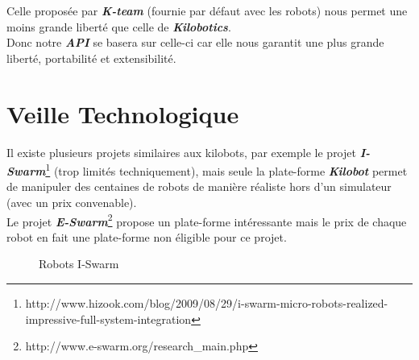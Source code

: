 \documentclass[a4paper,8pt]{report}
\begin{document}
\medskip
Celle propos\'ee par \textit{\textbf{K-team}} (fournie par d\'efaut avec les robots) nous permet une moins grande libert\'e que celle de \textit{\textbf{Kilobotics}}.\\
Donc notre \textit{\textbf{API}} se basera sur celle-ci car elle nous garantit une plus grande libert\'e, portabilit\'e et extensibilit\'e.

\section*{Veille Technologique}\label{sec:name}

Il existe plusieurs projets similaires aux kilobots, par exemple le projet \textit{\textbf{I-Swarm}}\footnote{http://www.hizook.com/blog/2009/08/29/i-swarm-micro-robots-realized-impressive-full-system-integration} (trop limités techniquement), mais seule la plate-forme \textit{\textbf{Kilobot}} permet de manipuler des centaines de robots de mani\`ere r\'ealiste hors d'un simulateur (avec un prix convenable).\\
Le projet \textit{\textbf{E-Swarm}}\footnote{http://www.e-swarm.org/research_main.php} propose un plate-forme int\'eressante mais le prix de chaque robot en fait une plate-forme non \'eligible pour ce projet.\\

\begin{figure}[!h]
    \centering
    \caption{Robots I-Swarm}
\end{figure}
\end{document}
